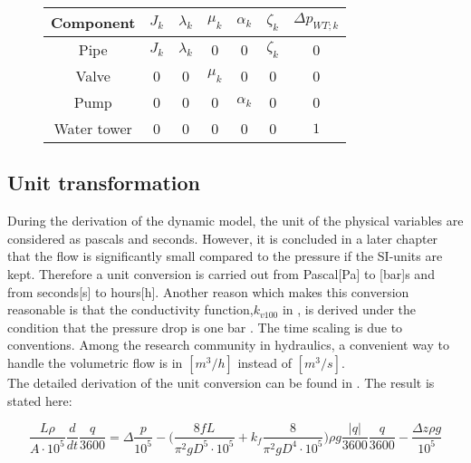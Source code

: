 \begin{figure}[H]
	\centering
\begin{tabular}{c|cccccc} 
		\bfseries Component    &     $J_k$  &$\lambda_k$    &    $\mu_k$    &   $\alpha_k$   &  $\zeta_k$   &  $\Delta p_{WT;k}$ \\\hline
		Pipe			  	   &     $J_k$  &$\lambda_k$    &    0          &   0            &  $\zeta_k$   &  0	    			\\ 
		Valve       	       &     0      &0              &    $\mu_k$    &   0 		     &  0    		&  0					\\ 
		Pump 		    	   &     0      &0              &    0          &   $\alpha_k$   &  0    		&  0	    			\\
		Water tower 	   	   &     0      &0              &    0          &   0            &  0    		&  $1$	
\end{tabular}
		\label{tab:parametrization_model}

\end{figure}	

\subsection{Unit transformation}
\label{unittransform}

During the derivation of the dynamic model, the unit of the physical variables are considered as pascals and seconds. However, it is concluded in a later chapter that the flow is significantly small compared to the pressure if the SI-units are kept. Therefore a unit conversion is carried out from Pascal[Pa] to [bar]s and from seconds[s] to hours[h]. Another reason which makes this conversion reasonable is that the conductivity function,$k_{v100}$ in , is derived under the condition that the pressure drop is one bar \cite{keller}. The time scaling is due to conventions. Among the research community in hydraulics, a convenient way to handle the volumetric flow is in $[m^3/h]$ instead of $[m^3/s]$. 
\\
The detailed derivation of the unit conversion can be found in . The result is stated here: 

\begin{equation}
   \frac{L \rho}{A\cdot10^5} \frac{d}{dt}\frac{q}{3600} = \Delta \frac{p}{10^5} - \Big(\frac{8fL}{\pi^{2}gD^5\cdot10^5} + k_f \frac{8}{\pi^2gD^4\cdot10^5}\Big) \rho g \frac{|q|}{3600} \frac{q}{3600} - \frac{\Delta z \rho g}{10^5}
\end{equation}
